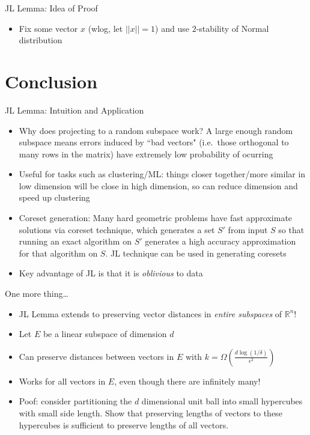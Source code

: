 \documentclass[aspectratio=169]{beamer}
\begin{document}
\begin{frame}{JL Lemma: Idea of Proof}
\protect\hypertarget{jl-lemma-idea-of-proof}{}
\begin{itemize}
\tightlist
\item
  Fix some vector \(x\) (wlog, let \(||x||=1\)) and use \(2\)-stability
  of Normal distribution
\end{itemize}
\end{frame}

\section{Conclusion}

\frame{\sectionpage}

\begin{frame}{JL Lemma: Intuition and Application}
\protect\hypertarget{jl-lemma-intuition-and-application}{}
\begin{itemize}
\tightlist
\item
  Why does projecting to a random subspace work? A large enough random
  subspace means errors induced by ``bad vectors" (i.e.~those orthogonal
  to many rows in the matrix) have extremely low probability of ocurring \pause
\item
  Useful for tasks such as clustering/ML: things closer together/more
  similar in low dimension will be close in high dimension, so can
  reduce dimension and speed up clustering \pause
\item
  Coreset generation: Many hard geometric problems have fast approximate
  solutions via coreset technique, which generates a set \(S'\) from
  input \(S\) so that running an exact algorithm on \(S'\) generates a
  high accuracy approximation for that algorithm on \(S\). JL technique
  can be used in generating coresets \pause
\item
  Key advantage of JL is that it is \textit{oblivious} to data
\end{itemize}
\end{frame}

\begin{frame}{One more thing\ldots{}}
\protect\hypertarget{one-more-thing}{}
\begin{itemize}
\tightlist
\item
  JL Lemma extends to preserving vector distances in
  \textit{entire subspaces} of \(\mathbb{R}^n\)! \pause
\item
  Let \(E\) be a linear subspace of dimension \(d\) \pause
\item
  Can preserve distances between vectors in \(E\) with
  \(k = \Omega\left(\frac{d\log(1/\delta)}{\epsilon^2}\right)\) \pause
\item
  Works for all vectors in \(E\), even though there are infinitely many! \pause
\item
  Poof: consider partitioning the \(d\) dimensional unit ball into small
  hypercubes with small side length. Show that preserving lengths of
  vectors to these hypercubes is sufficient to preserve lengths of all
  vectors.
\end{itemize}
\end{frame}
\end{document}
